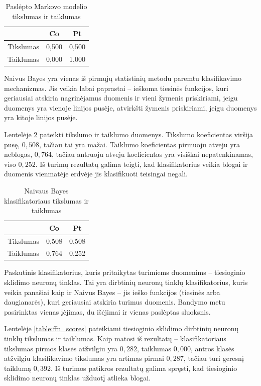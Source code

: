\documentclass[]{vgtuef}
\begin{document}
\begin{table}[!t]
  \renewcommand{\arraystretch}{1.3}
  \centering
  \caption{Paslėpto Markovo modelio tikslumas ir taiklumas}
  \label{table:hmm_scores}
  \begin{tabular}{|c|c|c|} \hline
    & Co & Pt \\ \hline
    Tikslumas & 0,500 & 0,500 \\ \hline
    Taiklumas & 0,000 & 1,000 \\ \hline
  \end{tabular}
\end{table}

Naivus Bayes \cite{R22230} yra vienas iš pirmųjų statistinių metodu paremtu klasifikavimo mechanizmas. Jis veikia labai paprastai -- ieškoma tiesinės funkcijos, kuri geriausiai atskiria nagrinėjamus duomenis ir vieni žymenis priskiriami, jeigu duomenys yra vienoje linijos pusėje, atvirkšti žymenis priskiriami, jeigu duomenys yra kitoje linijos pusėje. 

Lentelėje \ref{table:nb_scores} pateikti tikslumo ir taiklumo duomenys. Tikslumo koeficientas viršija pusę, $0,508$, tačiau tai yra mažai. Taiklumo koeficientas pirmuoju atveju yra neblogas, $0,764$, tačiau antruoju atveju koeficientas yra visiškai nepatenkinamas, viso $0,252$. Iš turimų rezultatų galima teigti, kad klasifikatorius veikia blogai ir duomenis vienmatėje erdvėje jis klasifikuoti teisingai negali.

\begin{table}[!t]
  \centering
  \caption{Naivaus Bayes klasifikatoriaus tikslumas ir taiklumas}
  \label{table:nb_scores}
  \begin{tabular}{|c|c|c|} \hline
    & Co & Pt \\ \hline
    Tikslumas & 0,508 & 0,508 \\ \hline
    Taiklumas & 0,764 & 0,252 \\ \hline
  \end{tabular}
\end{table}

Paskutinis klasifikatorius, kuris pritaikytas turimiems duomenims -- tiesioginio sklidimo neuronų tinklas. Tai yra dirbtinių neuronų tinklų klasifikatorius, kuris veikia panašiai kaip ir Naivus Bayes -- jis ieško funkcijos (tiesinės arba daugianarės), kuri geriausiai atskiria turimus duomenis. Bandymo metu pasirinktas vienas įėjimas, du išėjimai ir vienas paslėptas sluoksnis. 

Lentelėje \ref{table:ffn_scores} pateikiami tiesioginio sklidimo dirbtinių neuronų tinklų tikslumas ir taiklumas. Kaip matosi iš rezultatų -- klasifikatoriaus tikslumas pirmos klasės atžvilgiu yra $0,282$, taiklumas $0,000$, antros klasės atžvilgiu klasifikavimo tikslumas yra artimas pirmai $0,287$, tačiau turi geresnį taiklumą $0,392$. Iš turimos patikros rezultatų galima spręsti, kad tiesioginio sklidimo neuronų tinklas užduotį atlieka blogai.
\end{document}
